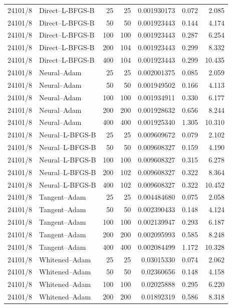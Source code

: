 \begin{longtable}{llrrrrr}
24101/8 & Direct--L-BFGS-B & 25 & 25 & 0.001930173 & 0.072 & 2.085\\
24101/8 & Direct--L-BFGS-B & 50 & 50 & 0.001923443 & 0.144 & 4.174\\
24101/8 & Direct--L-BFGS-B & 100 & 100 & 0.001923443 & 0.287 & 6.254\\
24101/8 & Direct--L-BFGS-B & 200 & 104 & 0.001923443 & 0.299 & 8.332\\
24101/8 & Direct--L-BFGS-B & 400 & 104 & 0.001923443 & 0.299 & 10.435\\
24101/8 & Neural--Adam & 25 & 25 & 0.002001375 & 0.085 & 2.059\\
24101/8 & Neural--Adam & 50 & 50 & 0.001949502 & 0.166 & 4.113\\
24101/8 & Neural--Adam & 100 & 100 & 0.001934911 & 0.330 & 6.177\\
24101/8 & Neural--Adam & 200 & 200 & 0.001928632 & 0.656 & 8.244\\
24101/8 & Neural--Adam & 400 & 400 & 0.001925340 & 1.305 & 10.310\\
24101/8 & Neural--L-BFGS-B & 25 & 25 & 0.009609672 & 0.079 & 2.102\\
24101/8 & Neural--L-BFGS-B & 50 & 50 & 0.009608327 & 0.159 & 4.190\\
24101/8 & Neural--L-BFGS-B & 100 & 100 & 0.009608327 & 0.315 & 6.278\\
24101/8 & Neural--L-BFGS-B & 200 & 102 & 0.009608327 & 0.322 & 8.364\\
24101/8 & Neural--L-BFGS-B & 400 & 102 & 0.009608327 & 0.322 & 10.452\\
24101/8 & Tangent--Adam & 25 & 25 & 0.004484680 & 0.075 & 2.058\\
24101/8 & Tangent--Adam & 50 & 50 & 0.002390433 & 0.148 & 4.124\\
24101/8 & Tangent--Adam & 100 & 100 & 0.002139947 & 0.293 & 6.187\\
24101/8 & Tangent--Adam & 200 & 200 & 0.002095993 & 0.585 & 8.248\\
24101/8 & Tangent--Adam & 400 & 400 & 0.002084499 & 1.172 & 10.328\\
24101/8 & Whitened--Adam & 25 & 25 & 0.03015330 & 0.074 & 2.062\\
24101/8 & Whitened--Adam & 50 & 50 & 0.02360656 & 0.148 & 4.158\\
24101/8 & Whitened--Adam & 100 & 100 & 0.02025888 & 0.295 & 6.220\\
24101/8 & Whitened--Adam & 200 & 200 & 0.01892319 & 0.586 & 8.318\\

\end{longtable}

